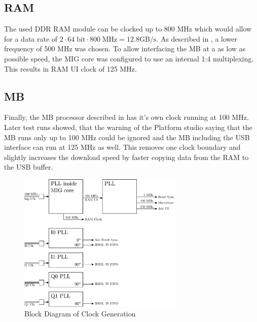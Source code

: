 \subsection{\gls{RAM}}
\label{sec:fpga_clock_ram}
The used \gls{DDR} \gls{RAM} module can be clocked up to 800 MHz which would
allow for a data rate of
$2 \cdot 64\;\text{bit} \cdot 800\;\text{MHz} = 12.8 \text{GB} / \text{s}$.
As described in , a lower frequency of 500 MHz
was chosen. To allow interfacing the \gls{MB} at a as low as possible speed,
the \gls{MIG} core was configured to use an internal 1:4 multiplexing. This results
in \gls{RAM} \gls{UI} clock of 125 MHz.

\subsection{\acrfull{MB}}
Finally, the \gls{MB} processor described in  has
it's own clock running at 100 MHz. \\

Later test runs showed, that the warning of the Platform studio saying that the
\gls{MB} runs only up to 100 MHz could be ignored and the \gls{MB} including
the \gls{USB} interface can run at 125 MHz as well. This removes one clock boundary
and slightly increases the download speed by faster copying data from the
\gls{RAM} to the \gls{USB} buffer. \\

\begin{figure}
  \centering
  \includegraphics[width=0.7\textwidth]{figures/clock_generation}
  \caption{Block Diagram of Clock Generation}
  \label{fig:fpga_clock_generation}
\end{figure}

